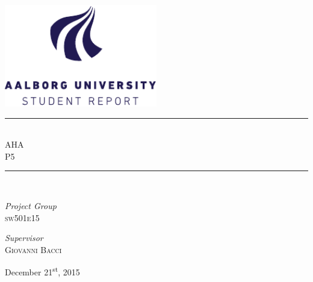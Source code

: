 \begin{titlepage}
\begin{center}
\newcommand{\HRule}{\rule{\linewidth}{0.5mm}}

\includegraphics[width=0.5\textwidth]{aau_logo_en.pdf}~\\[1cm]



\HRule \\[0.4cm]
{ \huge AHA\\[0.4cm]
  \large \textsc{P5}}

\HRule \\[1.5cm]

\begin{minipage}{0.4\textwidth}
\begin{flushleft} \large
\emph{Project Group}\\
\textsc{sw501e15}
\end{flushleft}
\end{minipage}
\begin{minipage}{0.4\textwidth}
\begin{flushright} \large
\emph{Supervisor} \\
\textsc{Giovanni Bacci}
\end{flushright}
\end{minipage}

\vfill

{\large December 21\textsuperscript{st}, 2015}

\end{center}
\end{titlepage}
